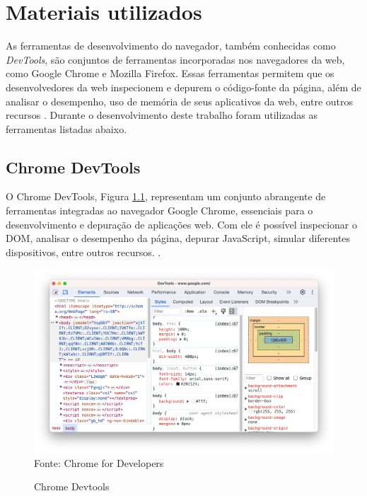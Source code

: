 \chapter{Materiais utilizados}
\label{chap:materiais}

As ferramentas de desenvolvimento do navegador, também conhecidas como \textit{DevTools}, são conjuntos de ferramentas incorporadas nos navegadores da web, como Google Chrome e Mozilla Firefox. Essas ferramentas permitem que os desenvolvedores da web inspecionem e depurem o código-fonte da página, além de analisar o desempenho, uso de memória de seus aplicativos da web, entre outros recursos \cite{apple}. Durante o desenvolvimento deste trabalho foram utilizadas as ferramentas listadas abaixo.

\section{Chrome DevTools}
O Chrome DevTools, Figura \ref{fig:chrome-devtools}, representam um conjunto abrangente de ferramentas integradas ao navegador Google Chrome, essenciais para o desenvolvimento e depuração de aplicações web. Com ele é possível inspecionar o DOM, analisar o desempenho da página, depurar JavaScript, simular diferentes dispositivos, entre outros recursos. \cite{chrome}.
\begin{figure}[!htb]
    \centering
    \caption{Chrome Devtools}
    \includegraphics[width=0.65 \linewidth]{assets/chrome-devtools.png}\\
    {\footnotesize Fonte: Chrome for Developers}
    \label{fig:chrome-devtools}
\end{figure}
\newpage
